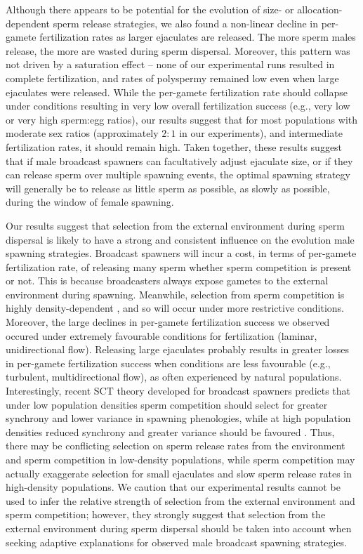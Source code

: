 \documentclass{article}
\begin{document}
Although there appears to be potential for the evolution of size- or allocation-dependent sperm release strategies, we also found a non-linear decline in per-gamete fertilization rates as larger ejaculates are released. The more sperm males release, the more are wasted during sperm dispersal. Moreover, this pattern was not driven by a saturation effect -- none of our experimental runs resulted in complete fertilization, and rates of polyspermy remained low even when large ejaculates were released. While the per-gamete fertilization rate should collapse under conditions resulting in very low overall fertilization success (e.g., very low or very high sperm:egg ratios), our results suggest that for most populations with moderate sex ratios (approximately $2:1$ in our experiments), and intermediate fertilization rates, it should remain high. Taken together, these results suggest that if male broadcast spawners can facultatively adjust ejaculate size, or if they can release sperm over multiple spawning events, the optimal spawning strategy will generally be to release as little sperm as possible, as slowly as possible, during the window of female spawning. 

Our results suggest that selection from the external environment during sperm dispersal is likely to have a strong and consistent influence on the evolution male spawning strategies. Broadcast spawners will incur a cost, in terms of per-gamete fertilization rate, of releasing many sperm whether sperm competition is present or not. This is because broadcasters always expose gametes to the external environment during spawning. Meanwhile, selection from sperm competition is highly density-dependent \citep{Parker1982,Levitan1998,BodeMarshall2007,Parker2017}, and so will occur under more restrictive conditions. Moreover, the large declines in per-gamete fertilization success we observed occured under extremely favourable conditions for fertilization (laminar, unidirectional flow). Releasing large ejaculates probably results in greater losses in per-gamete fertilization success when conditions are less favourable (e.g., turbulent, multidirectional flow), as often experienced by natural populations. Interestingly, recent SCT theory developed for broadcast spawners predicts that under low population densities sperm competition should select for greater synchrony and lower variance in spawning phenologies, while at high population densities reduced synchrony and greater variance should be favoured \citep{Olito2015,Olito2017}. Thus, there may be conflicting selection on sperm release rates from the environment and sperm competition in low-density populations, while sperm competition may actually exaggerate selection for small ejaculates and slow sperm release rates in high-density populations. We caution that our experimental results cannot be used to infer the relative strength of selection from the external environment and sperm competition; however, they strongly suggest that selection from the external environment during sperm dispersal should be taken into account when seeking adaptive explanations for observed male broadcast spawning strategies.
\end{document}
